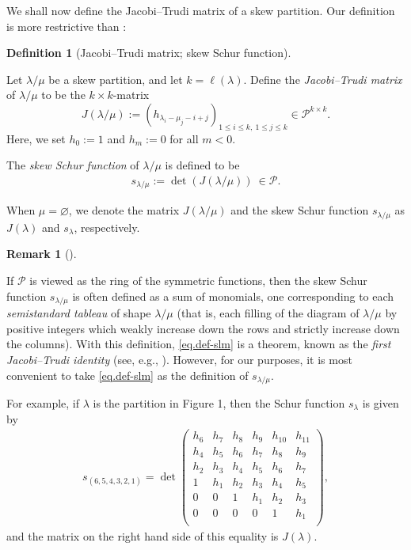 \documentclass[numbers=enddot,12pt,final,onecolumn,notitlepage]{scrartcl}%
\theoremstyle{definition}
\newtheorem{defi}[theo]{Definition}
\newenvironment{definition}[1][]
{\begin{defi}[#1]\begin{leftbar}}
{\end{leftbar}\end{defi}}
\newtheorem{remk}[theo]{Remark}
\newenvironment{remark}[1][]
{\begin{remk}[#1]\begin{leftbar}}
{\end{leftbar}\end{remk}}
\newcommand{\tup}[1]{\left( #1 \right)}
\renewcommand{\leq}{\leqslant}
\theoremstyle{plainsl}
\begin{document}
We shall now define the Jacobi--Trudi matrix of a skew partition. Our definition is more restrictive than \cite[Definition 2.3]{Anzis18}:

\begin{definition}[Jacobi--Trudi matrix; skew Schur function]
\label{Jacobi--Trudi Identity}
Let $\lambda / \mu$ be a skew partition, and let $k = \ell\tup{\lambda}$.
Define the \emph{Jacobi--Trudi matrix} of $\lambda/\mu$ to be the $k \times k$-matrix
\[
J(\lambda/\mu) := \tup{ h_{\lambda_i-\mu_j - i + j} }_{1\leq i\leq k,\ 1\leq j\leq k}
\in \mathcal{P}^{k\times k} .
\]
Here, we set $h_0 := 1$ and $h_m := 0$ for all $m < 0$.

The \emph{skew Schur function} of $\lambda/\mu$ is defined to be
\begin{align}
   s_{\lambda/\mu} := \det \tup{ J(\lambda/\mu) } \  \in \mathcal{P} .
\label{eq.def-slm}
\end{align}

When $\mu = \varnothing$, we denote the matrix $J(\lambda/\mu)$ and the skew Schur function $s_{\lambda/\mu}$ as $J(\lambda)$ and $s_\lambda$, respectively.
\end{definition}


\begin{remark}
\label{flushremark}
If $\mathcal{P}$ is viewed as the ring of the symmetric functions, then the skew Schur function $s_{\lambda/\mu}$ is often defined as a sum of monomials, one corresponding to each \emph{semistandard tableau} of shape $\lambda / \mu$ (that is, each filling of the diagram of $\lambda/\mu$ by positive integers which weakly increase down the rows and strictly increase down the columns). With this definition, \eqref{eq.def-slm} is a theorem, known as the \emph{first Jacobi--Trudi identity} (see, e.g., \cite[Theorem 7.16.1]{EC2}).
However, for our purposes, it is most convenient to take \eqref{eq.def-slm} as the definition of $s_{\lambda/\mu}$.
\end{remark}

For example, if $\lambda$ is the partition in Figure 1, then the Schur function $s_\lambda$ is given by
\begin{align*}
s_{(6,5,4,3,2,1)} =
\det
\begin{pmatrix}
h_6 & h_7 & h_8 & h_{9} & h_{10}& h_{11} \\ 
h_4 & h_5 & h_6 & h_{7} & h_{8}& h_{9} \\
h_2 & h_3 & h_4 & h_{5} & h_{6}& h_{7} \\
1 & h_1 & h_2 & h_{3} & h_{4}& h_{5} \\
0 & 0 & 1 & h_{1} & h_{2}& h_{3} \\
0 & 0 & 0 & 0 & 1 & h_{1} \\
\end{pmatrix} ,
\end{align*}
and the matrix on the right hand side of this equality is $J\tup{\lambda}$.
\end{document}
